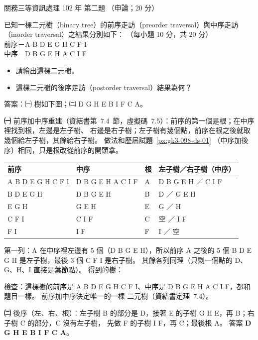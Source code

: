 \begin{pastexam}[label={px:gw3-102-ds-02}]{關務三等資訊處理 102 年 第二題}
（申論；20 分）

已知一棵二元樹（binary tree）的前序走訪（preorder traversal）與中序走訪（inorder traversal）之結果分別如下：
（每小題 10 分，共 20 分）\\
前序－A B D E G H C F I\\
中序－D B G E H A C I F
\begin{itemize}[leftmargin=2.2em]
\item[㈠] 請繪出這棵二元樹。
\item[㈡] 這棵二元樹的後序走訪（postorder traversal）結果為何？
\end{itemize}
\end{pastexam}

\begin{pastsoln}
答案：㈠ 樹如下圖；㈡ D G H E B I F C A。

\textbf{㈠} 前序加中序重建（資結書第~7.4~節，虛擬碼~7.5）：前序的第一個是根；在中序裡找到根，左邊是左子樹、
右邊是右子樹；左子樹有幾個點，前序在根之後就取幾個給左子樹，其餘給右子樹。 做法和歷屆試題~\ref{px:gk3-098-ds-01}
（中序加後序）相同，只是根改從前序的開頭拿。
\begin{center}
\small
\begin{tabular}{llll}
\toprule
前序 & 中序 & 根 & 左子樹／右子樹（中序） \\
\midrule
A B D E G H C F I & D B G E H A C I F & A & D B G E H ／ C I F \\
B D E G H & D B G E H & B & D ／ G E H \\
E G H & G E H & E & G ／ H \\
C F I & C I F & C & 空 ／ I F \\
F I & I F & F & I ／ 空 \\
\bottomrule
\end{tabular}
\end{center}
第一列：A 在中序裡左邊有 $5$ 個（D B G E H），所以前序 A 之後的 $5$ 個 B D E G H 是左子樹，最後 $3$ 個 C F I
是右子樹。 其餘各列同理（只剩一個點的 D、G、H、I 直接是葉節點）。 得到的樹：
\begin{center}
\end{center}
檢查：這棵樹的前序是 A B D E G H C F I、中序是 D B G E H A C I F，都和題目一樣。 前序加中序決定唯一的一棵
二元樹（資結書定理~7.4）。

\textbf{㈡} 後序（左、右、根）：左子樹 B 的部分是 D，接著 E 的子樹 G H E，再 B；右子樹 C 的部分，C 沒有左子樹，
先做 F 的子樹 I F，再 C；最後根 A。 答案 \textbf{D G H E B I F C A}。
\end{pastsoln}
